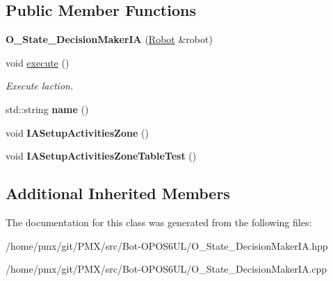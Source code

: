 \subsection*{Public Member Functions}
\begin{DoxyCompactItemize}
\item 
\mbox{\label{classO__State__DecisionMakerIA_a06de7488414f8b4a4a1f97e4de93a707}} 
{\bfseries O\+\_\+\+State\+\_\+\+Decision\+Maker\+IA} (\hyperlink{classRobot}{Robot} \&robot)
\item 
\mbox{\label{classO__State__DecisionMakerIA_a96d1f2a7618d607fd10cc51b9111e653}} 
void \hyperlink{classO__State__DecisionMakerIA_a96d1f2a7618d607fd10cc51b9111e653}{execute} ()
\begin{DoxyCompactList}\small\item\em Execute l\textquotesingle{}action. \end{DoxyCompactList}\item 
\mbox{\label{classO__State__DecisionMakerIA_a0fb50f04e2b10aeb7fe8ea4386c4f70f}} 
std\+::string {\bfseries name} ()
\item 
\mbox{\label{classO__State__DecisionMakerIA_a9b35f6bac1a5602ec2a711fa280be4a6}} 
void {\bfseries I\+A\+Setup\+Activities\+Zone} ()
\item 
\mbox{\label{classO__State__DecisionMakerIA_a8bd1c4d72bec8768c7c7c15bd2e665d8}} 
void {\bfseries I\+A\+Setup\+Activities\+Zone\+Table\+Test} ()
\end{DoxyCompactItemize}
\subsection*{Additional Inherited Members}


The documentation for this class was generated from the following files\+:\begin{DoxyCompactItemize}
\item 
/home/pmx/git/\+P\+M\+X/src/\+Bot-\/\+O\+P\+O\+S6\+U\+L/O\+\_\+\+State\+\_\+\+Decision\+Maker\+I\+A.\+hpp\item 
/home/pmx/git/\+P\+M\+X/src/\+Bot-\/\+O\+P\+O\+S6\+U\+L/O\+\_\+\+State\+\_\+\+Decision\+Maker\+I\+A.\+cpp\end{DoxyCompactItemize}
